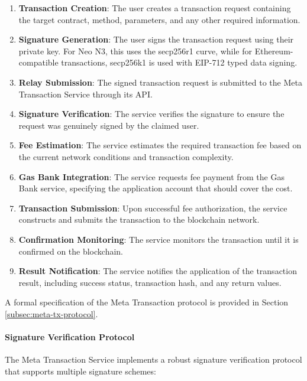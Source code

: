\documentclass{article}
\begin{document}
\begin{enumerate}
    \item \textbf{Transaction Creation}: The user creates a transaction request containing the target contract, method, parameters, and any other required information.
    
    \item \textbf{Signature Generation}: The user signs the transaction request using their private key. For Neo N3, this uses the secp256r1 curve, while for Ethereum-compatible transactions, secp256k1 is used with EIP-712 typed data signing.
    
    \item \textbf{Relay Submission}: The signed transaction request is submitted to the Meta Transaction Service through its API.
    
    \item \textbf{Signature Verification}: The service verifies the signature to ensure the request was genuinely signed by the claimed user.
    
    \item \textbf{Fee Estimation}: The service estimates the required transaction fee based on the current network conditions and transaction complexity.
    
    \item \textbf{Gas Bank Integration}: The service requests fee payment from the Gas Bank service, specifying the application account that should cover the cost.
    
    \item \textbf{Transaction Submission}: Upon successful fee authorization, the service constructs and submits the transaction to the blockchain network.
    
    \item \textbf{Confirmation Monitoring}: The service monitors the transaction until it is confirmed on the blockchain.
    
    \item \textbf{Result Notification}: The service notifies the application of the transaction result, including success status, transaction hash, and any return values.
\end{enumerate}

A formal specification of the Meta Transaction protocol is provided in Section \ref{subsec:meta-tx-protocol}.



\paragraph{Signature Verification Protocol}
The Meta Transaction Service implements a robust signature verification protocol that supports multiple signature schemes:
\end{document}
